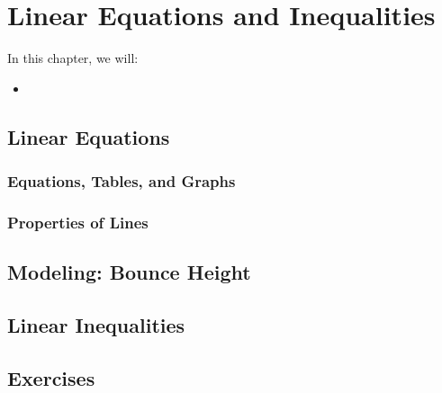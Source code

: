 
\chapter{Linear Equations and Inequalities}

\begin{summary}
In this chapter, we will: 
\begin{itemize}
    \item 
\end{itemize}
\end{summary}

\newpage 

\section{Linear Equations}

\subsection{Equations, Tables, and Graphs}
\subsection{Properties of Lines}


\newpage 
\section{Modeling: Bounce Height}

\newpage 
\section{Linear Inequalities}


\newpage 
\section{Exercises} 